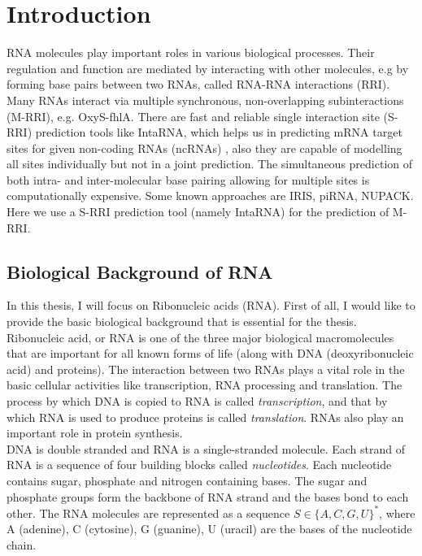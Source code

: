 \documentclass[twoside,a4paper]{report}
\begin{document}
	\chapter{Introduction}
	RNA molecules play important roles in various biological processes. Their regulation and function are mediated by interacting with other molecules, e.g by forming base pairs between two RNAs, called RNA-RNA interactions (RRI).  Many RNAs interact via multiple synchronous, non-overlapping subinteractions (M-RRI), e.g. OxyS-fhlA. There are fast and reliable single interaction site (S-RRI) prediction tools like IntaRNA, which helps us in predicting mRNA target sites for given non-coding RNAs (ncRNAs) , also they are capable of modelling all sites individually but not in a joint prediction. The simultaneous prediction of both intra- and inter-molecular base pairing allowing for multiple sites is computationally expensive. Some known approaches are IRIS, piRNA, NUPACK. Here we use a S-RRI prediction tool (namely IntaRNA) for the prediction of M-RRI.
	
	\section{Biological Background of RNA}
	In this thesis, I will focus on Ribonucleic acids (RNA). First of all, I would like to provide the basic biological background that is essential for the thesis. Ribonucleic acid, or RNA is one of the three major biological macromolecules that are important for all known forms of life (along with DNA (deoxyribonucleic acid) and proteins). The interaction between two RNAs plays a vital role in the basic cellular activities like transcription, RNA processing and translation. The process by which DNA is copied to RNA is called \textit{transcription}, and that by which RNA is used to produce proteins is called \textit{translation}. RNAs also play an important role in protein synthesis. \\
	
	 DNA is double stranded and RNA is a single-stranded molecule. Each strand of RNA is a sequence of four building blocks called \textit{nucleotides}. Each nucleotide contains sugar, phosphate and nitrogen containing bases. The sugar and phosphate groups form the backbone of RNA strand and the bases bond to each other. The RNA molecules are represented as a sequence $S \in \{A, C, G, U\} ^*$, where A (adenine), C (cytosine), G (guanine), U (uracil) are the bases of the nucleotide chain.\\
	 
\end{document}
